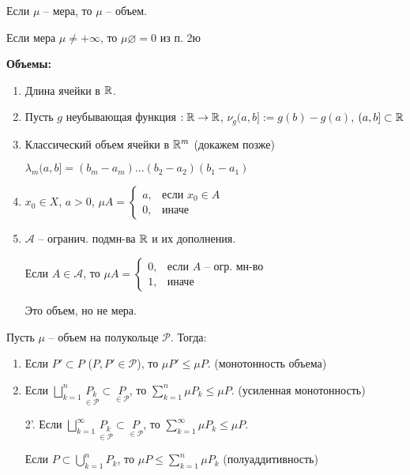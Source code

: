 \begin{remark} 
    Если $\mu$ – мера, то $\mu$ – объем.
\end{remark}

\begin{exercise}
    Если мера $\mu \not = +\infty$, то $\mu \varnothing = 0$ из п. 2ю
\end{exercise}

\begin{example}
    \textbf{Объемы:}

    \begin{enumerate}
        \item Длина ячейки в $\mathbb{R}$.
        \item Пусть $g$ неубывающая функция $:\mathbb{R}\rightarrow \mathbb{R}$, $\nu_g(a, b]:=g(b)- g(a)$, $(a, b]\subset \mathbb{R}$
        \item Классический объем ячейки в $\mathbb{R}^m$ (докажем позже)
        
        $\lambda_m(a, b] = (b_m - a_m)...(b_2 - a_2)(b_1 - a_1)$
        \item $x_0\in X$, $a>0$, $\mu A =\left\{\begin{array}{ll}
            a, & \text{если } x_0\in A  \\
            0, & \text{иначе} 
       \end{array}\right.$
        \item $\mathcal{A}$ – огранич. подмн-ва $\mathbb{R}$ и их дополнения. 
        
        Если $A\in \mathcal{A}$, то $\mu A=\left\{\begin{array}{ll}
            0, & \text{если } A \text{ – огр. мн-во}  \\
            1, & \text{иначе} 
        \end{array}\right.$

        Это объем, но не мера.
    \end{enumerate}
\end{example}

\begin{theorem}
    Пусть $\mu$ – объем на полукольце $\mathcal{P}$. Тогда:

    \begin{enumerate}
        \item Если $P'\subset P$ ($P, P'\in \mathcal{P}$), то $\mu P' \leq \mu P$. (монотонность объема)
        \item Если $\bigsqcup\limits_{k=1}^n \underset{\in\mathcal{P}}{P_k}\subset \underset{\in\mathcal{P}}{P}$, то $\sum\limits_{k=1}^n \mu P_k \leq \mu P$. (усиленная монотонность)
        \item[2'.] Если $\bigsqcup\limits_{k=1}^\infty \underset{\in\mathcal{P}}{P_k}\subset \underset{\in\mathcal{P}}{P}$, то $\sum\limits_{k=1}^\infty \mu P_k \leq \mu P$.
        \item[] Если $P\subset \bigcup\limits_{k=1}^n P_k$, то $\mu P \leq \sum\limits_{k=1}^n \mu P_k$ (полуаддитивность)
    \end{enumerate}
\end{theorem}

